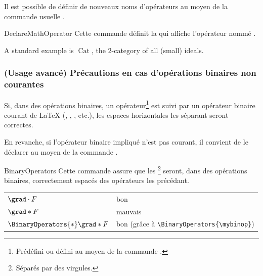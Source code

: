\documentclass[english,nolocaltoc]{nwejmart}
\newtheorem[style=definition]{fait}
\newtheorem[title=expérience]{experience}
\newtheorem[title-plural=anneaux]{anneau}
\newtheorem[title=idéal,title-plural=idéaux]{ideal}
\DeclareMathOperator{\cat}{Cat}
\newcommand{\mybinop}{\mathbin{*}}
\begin{document}
Il est possible de définir de nouveaux noms d'opérateurs au moyen de la commande
usuelle .

\begin{docCommand}{DeclareMathOperator}{}
  Cette commande définit la  qui affiche l'opérateur nommé
  .
\end{docCommand}

\begin{preamblecode}
\DeclareMathOperator{\cat}{Cat}
\end{preamblecode}
\begin{bodycode}[listing and text,listing options={deletekeywords={example},deletekeywords={[4]all}}]
A standard example is $\cat$, the $2$-category of all (small) ideals.
\end{bodycode}

\subsubsection{(Usage avancé) Précautions en cas d'opérations binaires non
  courantes}

Si, dans des opérations binaires, un opérateur\footnote{Prédéfini ou défini au
  moyen de la commande \protect{}.} est suivi par un
opérateur binaire courant de \LaTeX{} (,
, , etc.), les espaces horizontales les
séparant seront correctes.

En revanche, si l'opérateur binaire impliqué n'est pas courant, il convient de
le déclarer au moyen de la commande .

\begin{docCommand}{BinaryOperators}{}
  Cette commande assure que les \footnote{Séparés par
    des virgules.} seront, dans des opérations binaires, correctement espacés
  des opérateurs les précédant.
\end{docCommand}

\begin{preamblecode}[listing options={moretexcs={mybinop}}]
\newcommand{\mybinop}{\mathbin{*}}
\end{preamblecode}
\begin{bodycode}[listing and text,listing options={moretexcs={mybinop}}]
\begin{tabular}{>{$}l<{$}@{ : }l}
  \grad \cdot    F & bon     \\
  \grad \mybinop F & mauvais \\ \BinaryOperators{\mybinop}%
  \grad \mybinop F & bon (grâce à \verb|\BinaryOperators{\mybinop}|)
\end{tabular}
\end{bodycode}
\end{document}
